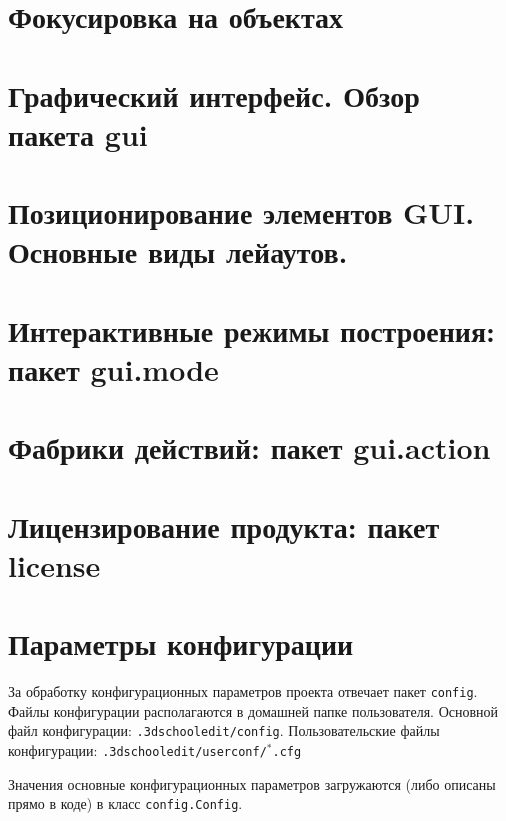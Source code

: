 \documentclass[fontsize=10px, a4paper, openany]{scrbook}
\begin{document}
\chapter{Фокусировка на объектах}

\chapter{Графический интерфейс. Обзор пакета \textbf{gui}}

\chapter{Позиционирование элементов GUI. Основные виды лейаутов.}

\chapter{Интерактивные режимы построения: пакет \textbf{gui.mode}}

\chapter{Фабрики действий: пакет \textbf{gui.action}}

\chapter{Лицензирование продукта: пакет \textbf{license}}

\chapter{Параметры конфигурации}

За обработку конфигурационных параметров проекта отвечает пакет \texttt{config}. Файлы конфигурации располагаются в домашней папке пользователя. Основной файл конфигурации: \texttt{.3dschooledit/config}. Пользовательские файлы конфигурации: \texttt{.3dschooledit/userconf/$^*$.cfg}

Значения основные конфигурационных параметров загружаются (либо описаны прямо в коде) в класс \texttt{config.Config}.
\end{document}
